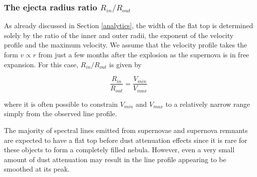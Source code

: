 \documentclass[useAMS,usenatbib,usegraphicx]{mnras}
\begin{document}
\subsubsection{The ejecta radius ratio $R_{in}/R_{out}$}

As already discussed in Section \ref{analytics}, the width of the flat top 
is determined solely by the ratio of the inner and outer radii, the 
exponent of the velocity profile and the maximum velocity.  We 
assume that the velocity profile takes the form $v \propto r$ from 
just a few months after the explosion as the supernova is in free 
expansion.  For this case, $R_{in}/R_{out}$ is given by

\begin{equation}
\frac{R_{in}}{R_{out}}=\frac{V_{min}}{V_{max}}
\end{equation}

\noindent where it is often possible to constrain $V_{min}$ and $V_{max}$ 
to a relatively narrow range simply from the observed line profile.

The majority of spectral lines emitted from supernovae and supernova 
remnants are expected to have a flat top before dust attenuation effects since it is rare for these 
objects to form a completely filled nebula.  However, even a very small amount of 
dust attenuation may result in the line profile appearing to be smoothed at its 
peak.
\end{document}
